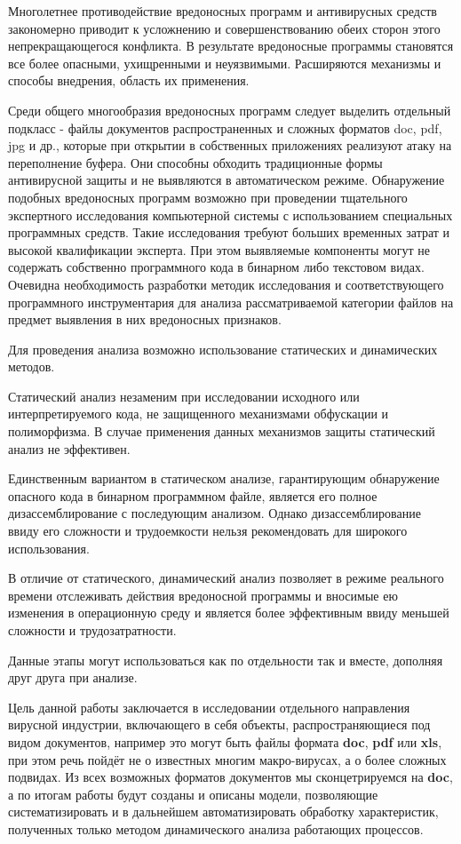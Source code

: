 
Многолетнее противодействие вредоносных программ и антивирусных средств закономерно приводит к усложнению и совершенствованию обеих сторон этого непрекращающегося конфликта. В результате вредоносные программы становятся все более опасными, ухищренными и неуязвимыми. Расширяются механизмы и способы внедрения, область их применения.

Среди общего многообразия вредоносных программ следует выделить отдельный подкласс -  файлы документов распространенных и сложных форматов doc, pdf, jpg и др., которые при открытии в собственных приложениях реализуют атаку на переполнение буфера. Они способны обходить традиционные формы антивирусной защиты и не выявляются в автоматическом режиме. Обнаружение подобных вредоносных программ возможно при проведении тщательного экспертного исследования компьютерной системы с использованием специальных программных средств. Такие исследования требуют больших временных затрат и высокой квалификации эксперта. При этом выявляемые компоненты могут не содержать собственно программного кода в бинарном либо текстовом видах. Очевидна необходимость разработки методик исследования и соответствующего программного инструментария для анализа рассматриваемой категории файлов на предмет выявления в них вредоносных признаков.

Для проведения анализа возможно использование статических и динамических методов.

Статический анализ незаменим при исследовании исходного или интерпретируемого кода, не защищенного механизмами обфускации и полиморфизма. В случае применения данных механизмов защиты статический анализ не эффективен.

Единственным вариантом в статическом анализе, гарантирующим обнаружение опасного кода в бинарном программном файле, является его полное дизассемблирование с последующим анализом. Однако дизассемблирование ввиду его сложности и трудоемкости нельзя рекомендовать для широкого использования.

В отличие от статического, динамический анализ позволяет в режиме реального времени отслеживать действия вредоносной программы и вносимые ею изменения в операционную среду и является более эффективным ввиду меньшей сложности и трудозатратности.

Данные этапы могут использоваться как по отдельности так и вместе, дополняя друг друга при анализе.

Цель данной работы заключается в исследовании отдельного направления вирусной индустрии, включающего в себя объекты, распространяющиеся под видом документов, например это могут быть файлы формата \textbf{doc}, \textbf{pdf} или \textbf{xls}, при этом речь пойдёт не о известных многим макро-вирусах, а о более сложных подвидах.
Из всех возможных форматов документов мы сконцетрируемся на \textbf{doc}, а по итогам работы будут созданы и описаны модели, позволяющие систематизировать и в дальнейшем автоматизировать обработку характеристик, полученных только методом динамического анализа работающих процессов.

